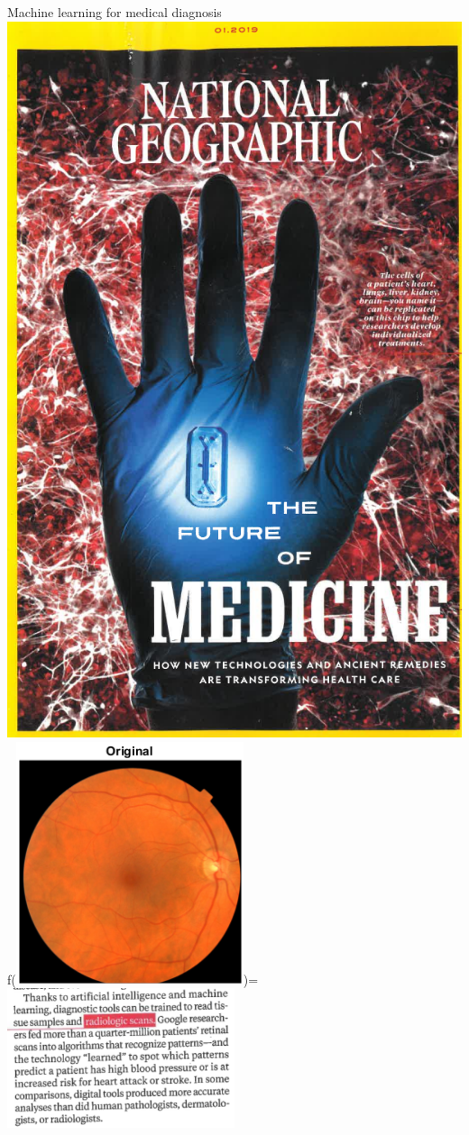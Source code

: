 \documentclass{article}
\begin{document}
{Machine learning for medical diagnosis}
\includegraphics[height=0.9\textheight]{retinal-scans/national-geographic-medicine-cover}
f(\includegraphics[width=0.5\textwidth]{retinal-scans/national-geographic-medicine-retina})=
\includegraphics[width=0.5\textwidth]{retinal-scans/national-geographic-medicine-paragraph}
\end{document}
